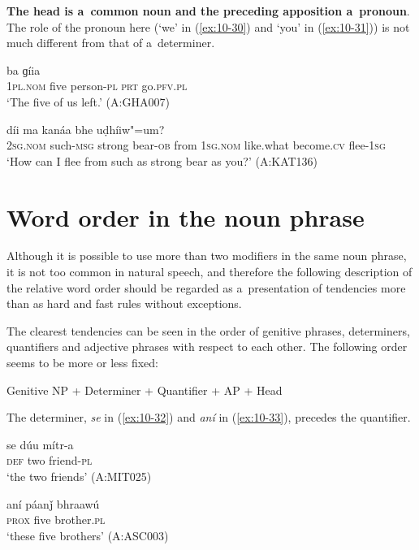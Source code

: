 \textbf{The head is a~common noun and the preceding apposition a~pronoun}. The role of the pronoun here (`we' in (\ref{ex:10-30}) and `you' in (\ref{ex:10-31})) is not much different from that of a~determiner. 

\begin{exe}
\ex
\label{ex:10-30}
 ba ɡíia \\
\textsc{1pl.nom} five person-\textsc{pl} \textsc{prt} go.\textsc{pfv.pl}  \\
\glt `The five of us left.' (A:GHA007)

\ex
\label{ex:10-31}
 díi ma kanáa bhe uḍhíiw"=um? \\
\textsc{2sg.nom} such-\textsc{msg} strong bear-\textsc{ob} from \textsc{1sg.nom}  like.what become.\textsc{cv} flee-\textsc{1sg} \\
\glt `How can I flee from such as strong bear as you?' (A:KAT136)
\end{exe}

\section{Word order in the noun phrase}
\label{sec:10-2}


Although it is possible to use more than two modifiers in the same noun phrase, it is not too common in natural speech, and therefore the following description of the relative word order should be regarded as a~presentation of tendencies more than as hard and fast rules without exceptions. 


The clearest tendencies can be seen in the order of genitive phrases, determiners, quantifiers and adjective phrases with respect to each other. The following order seems to be more or less fixed:


Genitive NP + Determiner + Quantifier + AP + Head


The determiner, \textit{se} in (\ref{ex:10-32}) and \textit{aní} in (\ref{ex:10-33}), precedes the quantifier.

\begin{exe}
\ex
\label{ex:10-32}
\gll se dúu mítr-a \\
\textsc{def} two friend-\textsc{pl} \\
\glt `the two friends' (A:MIT025)

\ex
\label{ex:10-33}
\gll aní páanǰ bhraawú \\
\textsc{prox} five brother.\textsc{pl}  \\
\glt `these five brothers' (A:ASC003)
\end{exe}

